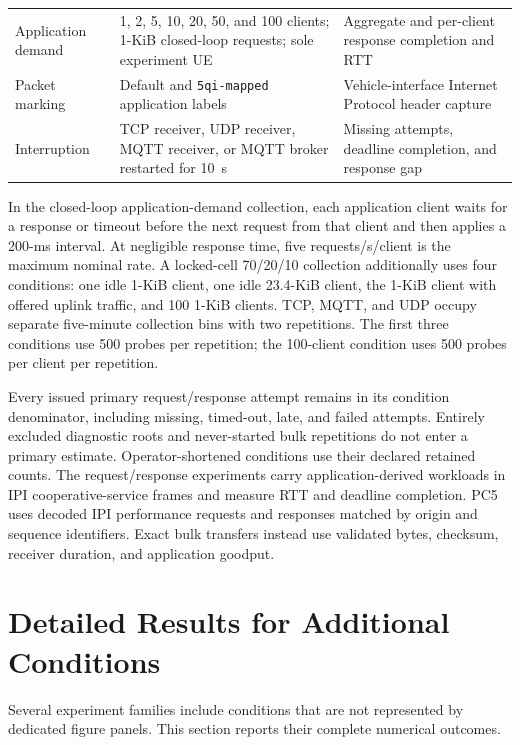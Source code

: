 \begin{table}[t]
\begin{tabular}{@{}p{}p{}p{}@{}}
    Application demand & 1, 2, 5, 10, 20, 50, and 100 clients; 1-KiB closed-loop requests; sole experiment UE & Aggregate and per-client response completion and RTT \\
    Packet marking & Default and \texttt{5qi-mapped} application labels & Vehicle-interface Internet Protocol header capture \\
    Interruption & TCP receiver, UDP receiver, MQTT receiver, or MQTT broker restarted for 10~s & Missing attempts, deadline completion, and response gap \\
    \bottomrule
  \end{tabular}
\end{table}

In the closed-loop application-demand collection, each application client waits
for a response or timeout before the next
request from that client and then applies a 200-ms interval. At negligible
response time, five requests/s/client is the maximum nominal rate. A
locked-cell 70/20/10 collection additionally uses four conditions: one idle 1-KiB client,
one idle 23.4-KiB client, the 1-KiB client with offered uplink traffic, and 100
1-KiB clients. TCP, MQTT, and UDP occupy separate five-minute collection bins
with two repetitions. The first three conditions use 500 probes per repetition;
the 100-client condition uses 500 probes per client per repetition.

Every issued primary request/response attempt remains in its condition
denominator, including missing, timed-out, late, and failed attempts. Entirely
excluded diagnostic roots and never-started bulk repetitions do not enter a
primary estimate. Operator-shortened conditions use their declared retained
counts. The request/response experiments carry application-derived workloads
in IPI cooperative-service frames and measure RTT and deadline completion.
PC5 uses decoded IPI performance requests and responses matched by origin and
sequence identifiers. Exact bulk transfers instead use
validated bytes, checksum, receiver duration, and application goodput.

\section{Detailed Results for Additional Conditions}
\label{app:detailed-results}

Several experiment families include conditions that are not represented by
dedicated figure panels. This section reports their complete numerical
outcomes.

